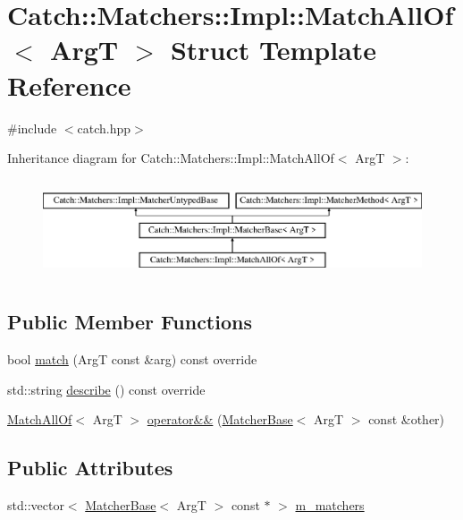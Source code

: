 \hypertarget{struct_catch_1_1_matchers_1_1_impl_1_1_match_all_of}{}\section{Catch\+:\+:Matchers\+:\+:Impl\+:\+:Match\+All\+Of$<$ ArgT $>$ Struct Template Reference}
\label{struct_catch_1_1_matchers_1_1_impl_1_1_match_all_of}


{\ttfamily \#include $<$catch.\+hpp$>$}

Inheritance diagram for Catch\+:\+:Matchers\+:\+:Impl\+:\+:Match\+All\+Of$<$ ArgT $>$\+:\begin{figure}[H]
\begin{center}
\leavevmode
\includegraphics[height=2.926829cm]{struct_catch_1_1_matchers_1_1_impl_1_1_match_all_of}
\end{center}
\end{figure}
\subsection*{Public Member Functions}
\begin{DoxyCompactItemize}
\item 
bool \mbox{\hyperlink{struct_catch_1_1_matchers_1_1_impl_1_1_match_all_of_acfb377bda2c58ae62e6df9c3a8a89f8f}{match}} (ArgT const \&arg) const override
\item 
std\+::string \mbox{\hyperlink{struct_catch_1_1_matchers_1_1_impl_1_1_match_all_of_acbb9a083e93b546fd33c9235b644c40f}{describe}} () const override
\item 
\mbox{\hyperlink{struct_catch_1_1_matchers_1_1_impl_1_1_match_all_of}{Match\+All\+Of}}$<$ ArgT $>$ \mbox{\hyperlink{struct_catch_1_1_matchers_1_1_impl_1_1_match_all_of_aa585510d47a76cd32178eec6000a41c9}{operator\&\&}} (\mbox{\hyperlink{struct_catch_1_1_matchers_1_1_impl_1_1_matcher_base}{Matcher\+Base}}$<$ ArgT $>$ const \&other)
\end{DoxyCompactItemize}
\subsection*{Public Attributes}
\begin{DoxyCompactItemize}
\item 
std\+::vector$<$ \mbox{\hyperlink{struct_catch_1_1_matchers_1_1_impl_1_1_matcher_base}{Matcher\+Base}}$<$ ArgT $>$ const  $\ast$ $>$ \mbox{\hyperlink{struct_catch_1_1_matchers_1_1_impl_1_1_match_all_of_a98d6a2611f195a4a5c49f92fd877be9a}{m\+\_\+matchers}}
\end{DoxyCompactItemize}
